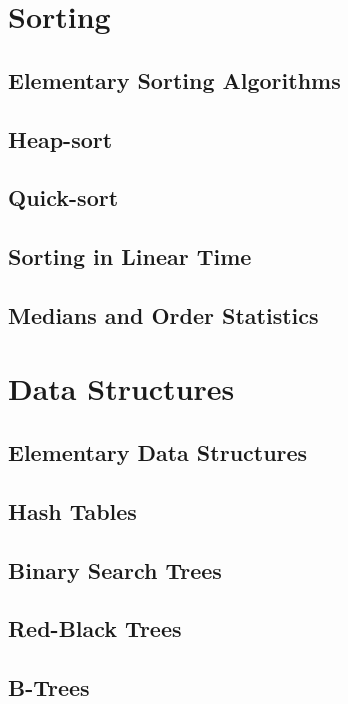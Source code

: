 	\chapter{Sorting}
		\section{Elementary Sorting Algorithms}

		\section{Heap-sort}

		\section{Quick-sort}

		\section{Sorting in Linear Time}

		\section{Medians and Order Statistics}

	\chapter{Data Structures}
		\section{Elementary Data Structures}

		\section{Hash Tables}

		\section{Binary Search Trees}

		\section{Red-Black Trees}

		\section{B-Trees}

